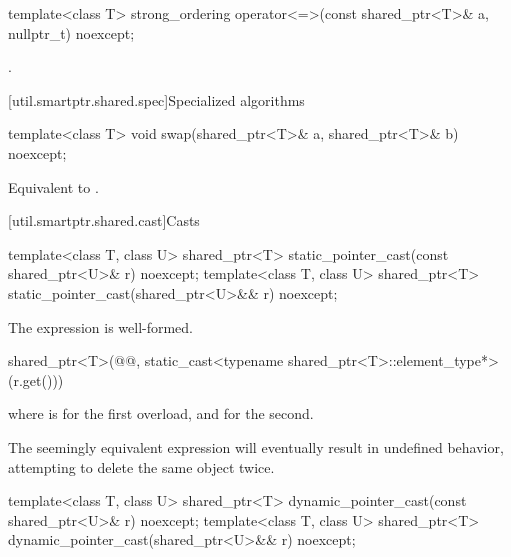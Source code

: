 %
\begin{itemdecl}
template<class T>
  strong_ordering operator<=>(const shared_ptr<T>& a, nullptr_t) noexcept;
\end{itemdecl}

\begin{itemdescr}
\pnum
\returns
{}.
\end{itemdescr}

[util.smartptr.shared.spec]{Specialized algorithms}

%
\begin{itemdecl}
template<class T>
  void swap(shared_ptr<T>& a, shared_ptr<T>& b) noexcept;
\end{itemdecl}

\begin{itemdescr}
\pnum
\effects
Equivalent to .
\end{itemdescr}

[util.smartptr.shared.cast]{Casts}

%
\begin{itemdecl}
template<class T, class U>
  shared_ptr<T> static_pointer_cast(const shared_ptr<U>& r) noexcept;
template<class T, class U>
  shared_ptr<T> static_pointer_cast(shared_ptr<U>&& r) noexcept;
\end{itemdecl}

\begin{itemdescr}
\pnum
\mandates
The expression  is well-formed.

\pnum
\returns
\begin{codeblock}
shared_ptr<T>(@@, static_cast<typename shared_ptr<T>::element_type*>(r.get()))
\end{codeblock}
where  is  for the first overload, and
 for the second.

\pnum
\begin{note}
The seemingly equivalent expression
will eventually result in undefined behavior, attempting to delete the
same object twice.
\end{note}
\end{itemdescr}

%
\begin{itemdecl}
template<class T, class U>
  shared_ptr<T> dynamic_pointer_cast(const shared_ptr<U>& r) noexcept;
template<class T, class U>
  shared_ptr<T> dynamic_pointer_cast(shared_ptr<U>&& r) noexcept;
\end{itemdecl}

